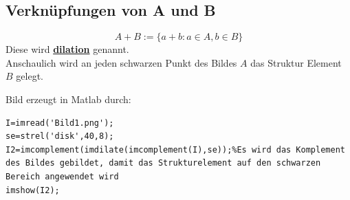 \documentclass{article}
\theoremstyle{plain}
\theoremstyle{definition}
\numberwithin{equation}{section}
\newcommand{\mim}[1] {
\underline{\textbf{#1\index{#1}}}
}
\begin{document}
    \subsection{Verknüpfungen von A und B}
        \[A+B := \{a + b : a \in A, b \in B\}\]
        Diese wird \mim{dilation} genannt.\\
        Anschaulich wird an jeden schwarzen Punkt des Bildes $A$ das Struktur Element $B$ gelegt.
        \begin{center}
        \end{center}
        Bild erzeugt in Matlab durch:\\
        \begin{lstlisting}
I=imread('Bild1.png');
se=strel('disk',40,8);
I2=imcomplement(imdilate(imcomplement(I),se));%Es wird das Komplement des Bildes gebildet, damit das Strukturelement auf den schwarzen Bereich angewendet wird
imshow(I2);
        \end{lstlisting}
\end{document}
